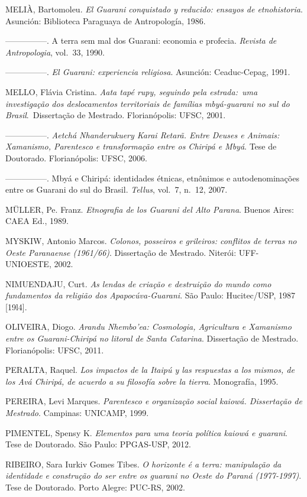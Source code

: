 MELIÀ, Bartomoleu. \emph{El Guarani conquistado y reducido: ensayos de
etnohistoria}. Asunción: Biblioteca Paraguaya de Antropología, 1986.

—————. A terra sem mal dos Guarani: economia e profecia. \emph{Revista de
Antropologia}, vol.~33, 1990. 

—————. \emph{El Guarani: experiencia religiosa}. Asunción: Ceaduc-Cepag, 1991.

MELLO, Flávia Cristina. \emph{Aata tapé rupy, seguindo pela estrada:~uma
investigação dos deslocamentos territoriais de famílias mbyá-guarani no
sul do Brasil}.~Dissertação de Mestrado. Florianópolis: UFSC, 2001.

—————. \emph{Aetchá Nhanderukuery Karai Retarã. Entre Deuses e Animais:
Xamanismo, Parentesco e transformação entre os Chiripá e Mbyá}. Tese de
Doutorado. Florianópolis: UFSC, 2006. 

—————. Mbyá e Chiripá: identidades étnicas, etnônimos e autodenominações
entre os Guarani do sul do Brasil. \emph{Tellus}, vol.~7, n.~12, 2007.

MÜLLER, Pe. Franz. \emph{Etnografia de los Guarani del Alto Parana}. Buenos
Aires: CAEA Ed., 1989.

MYSKIW, Antonio Marcos. \emph{Colonos, posseiros e grileiros: conflitos de
terras no Oeste Paranaense (1961/66)}. Dissertação de Mestrado. Niterói:
UFF-UNIOESTE, 2002.

NIMUENDAJU, Curt.  \emph{As lendas de criação e destruição do mundo como
fundamentos da religião dos Apapocúva-Guarani}. São Paulo: Hucitec/USP,
1987 [19l4].

OLIVEIRA, Diogo. \emph{Arandu Nhembo’ea: Cosmologia, Agricultura e Xamanismo
entre os Guarani-Chiripá no litoral de Santa Catarina}. Dissertação de
Mestrado. Florianópolis: UFSC, 2011.

PERALTA, Raquel. \emph{Los impactos de la Itaipú y las respuestas a los
mismos, de los Avá Chiripá, de acuerdo a su filosofía sobre la tierra}.
Monografía, 1995.

PEREIRA, Levi Marques. \emph{Parentesco e organização social kaiowá.
Dissertação de Mestrado}. Campinas: UNICAMP, 1999.

PIMENTEL, Spensy K. \emph{Elementos para uma teoria política kaiowá e guarani}.
 Tese de Doutorado. São Paulo: PPGAS-USP, 2012.

RIBEIRO, Sara Iurkiv Gomes Tibes. \emph{O horizonte é a terra: manipulação da
identidade e construção do ser entre os guarani no Oeste do Paraná
(1977-1997)}. Tese de Doutorado. Porto Alegre: PUC-RS, 2002.


